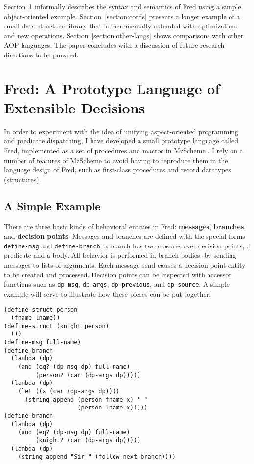 \documentclass{acm_proc_article-sp}
\newcommand{\defn}[1]{\textbf{#1}}
\newcommand{\code}[1]{\texttt{#1}}
\begin{document}
Section~\ref{section:fred} informally describes the syntax and
semantics of Fred using a simple object-oriented example.
Section~\ref{section:cords} presents a longer example of a small data
structure library that is incrementally extended with optimizations
and new operations.  Section~\ref{section:other-langs} shows
comparisons with other AOP languages.  The paper concludes with a
discussion of future research directions to be pursued.

\section{Fred: A Prototype Language of Extensible Decisions}
\label{section:fred}

In order to experiment with the idea of unifying aspect-oriented
programming and predicate dispatching, I have developed a small
prototype language called Fred, implemented as a set of procedures and
macros in MzScheme \cite{flatt97plt}.  I rely on a number of features
of MzScheme to avoid having to reproduce them in the language design
of Fred, such as first-class procedures and record datatypes
(structures).

\subsection{A Simple Example}

There are three basic kinds of behavioral entities in Fred:
\defn{messages}, \defn{branches}, and \defn{decision points}.
Messages and branches are defined with the special forms
\code{define-msg} and \code{define-branch}; a branch has two closures
over decision points, a predicate and a body.  All behavior is
performed in branch bodies, by sending messages to lists of arguments.
Each message send causes a decision point entity to be created and
processed.  Decision points can be inspected with accessor functions
such as \code{dp-msg}, \code{dp-args}, \code{dp-previous}, and
\code{dp-source}.  A simple example will serve to illustrate how these
pieces can be put together:

\begin{verbatim}
(define-struct person
  (fname lname))
(define-struct (knight person)
  ())
(define-msg full-name)
(define-branch
  (lambda (dp)
    (and (eq? (dp-msg dp) full-name)
         (person? (car (dp-args dp)))))
  (lambda (dp)
    (let ((x (car (dp-args dp))))
      (string-append (person-fname x) " "
                     (person-lname x)))))
(define-branch
  (lambda (dp)
    (and (eq? (dp-msg dp) full-name)
         (knight? (car (dp-args dp)))))
  (lambda (dp)
    (string-append "Sir " (follow-next-branch))))
\end{verbatim}
\end{document}
